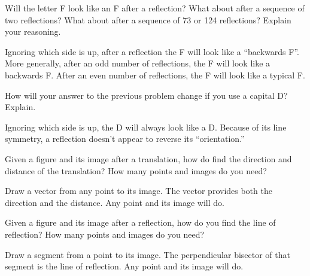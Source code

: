 \documentclass[nooutcomes]{ximera}
\begin{document}
\begin{question}
Will the letter F look like an F after a reflection?  What about after a sequence of two reflections?  What about after a sequence of 73 or 124 reflections?  Explain your reasoning.  
\begin{freeResponse}
\begin{hint}
Ignoring which side is up, after a reflection the F will look like a ``backwards F''.  More generally, after an odd number of reflections, the F will look like a backwards F.  After an even number of reflections, the F will look like a typical F.  
\end{hint}
\end{freeResponse}
\end{question}

\begin{question}
How will your answer to the previous problem change if you use a capital D?  Explain.  
\begin{freeResponse}
\begin{hint}
Ignoring which side is up, the D will always look like a D.  Because of its line symmetry, a reflection doesn't appear to reverse its ``orientation.''  
\end{hint}
\end{freeResponse}
\end{question}

\begin{question}
Given a figure and its image after a translation, how do find the direction and distance of the translation?    How many points and images do you need?  
\begin{freeResponse}
\begin{hint}
Draw a vector from any point to its image.  The vector provides both the direction and the distance.  Any point and its image will do.  
\end{hint}
\end{freeResponse}
\end{question}

\begin{question}
Given a figure and its image after a reflection, how do you find the line of reflection?  How many points and images do you need?  
\begin{freeResponse}
\begin{hint}
Draw a segment from a point to its image.  The perpendicular bisector of that segment is the line of reflection.  Any point and its image will do.  
\end{hint}
\end{freeResponse}
\end{question}
\end{document}
